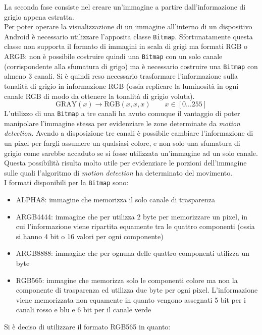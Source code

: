 La seconda fase consiste nel creare un'immagine a partire dall'informazione di grigio appena estratta.\\
Per poter operare la visualizzazione di un immagine all'interno di un dispositivo Android è necessario utilizzare l'apposita classe \texttt{Bitmap}. Sfortunatamente questa classe non supporta il formato di immagini in scala di grigi ma formati RGB o ARGB: non è possibile costruire quindi una \texttt{Bitmap} con un solo canale (corrispondente alla sfumatura di grigo) ma è necessario costruire una \texttt{Bitmap} con almeno 3 canali. Si è quindi reso necessario trasformare l'informazione sulla tonalità di grigio in informazione RGB (ossia replicare la luminosità in ogni canale RGB di modo da ottenere la tonalità di grigio voluta).
\[\text{GRAY}(x) \to \text{RGB}(x, x, x) \qquad x \in [0 \ldots 255] \]
L'utilizzo di una \texttt{Bitmap} a tre canali ha avuto comuque il vantaggio di poter manipolare l'immagine stessa per evidenziare le zone determinate da \textit{motion detection}. Avendo a disposizione tre canali è possibile cambiare l'informazione di un pixel per fargli assumere un qualsiasi colore, e non solo una sfumatura di grigio come sarebbe accaduto se si fosse utilizzata un'immagine ad un solo canale. Questa possibilità risulta molto utile per evidenziare le porzioni dell'immagine sulle quali l'algoritmo di \textit{motion detection} ha determinato del movimento.\\
I formati disponibili per la \texttt{Bitmap} sono:
\begin{itemize}
  \item ALPHA8: immagine che memorizza il solo canale di trasparenza
  \item ARGB4444: immagine che per utilizza 2 byte per memorizzare un pixel, in cui l'informazione viene ripartita equamente tra le quattro componenti (ossia si hanno 4 bit o 16 valori per ogni componente)
  \item ARGB8888: immagine che per ognuna delle quattro componenti utilizza un byte
  \item RGB565: immagine che memorizza solo le componenti colore ma non la componente di trasparenza ed utilizza due byte per ogni pixel. L'informazione viene memorizzata non equamente in quanto vengono assegnati 5 bit per i canali rosso e blu e 6 bit per il canale verde
\end{itemize}
Si è deciso di utilizzare il formato RGB565 in quanto:
